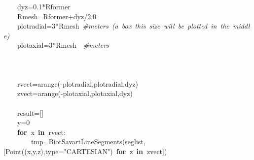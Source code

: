 \documentclass{article}
\newcommand{\hlstd}[1]{\textcolor[rgb]{0,0,0}{#1}}
\newcommand{\hlnum}[1]{\textcolor[rgb]{0.16,0.16,1}{#1}}
\newcommand{\hlstr}[1]{\textcolor[rgb]{1,0,0}{#1}}
\newcommand{\hlslc}[1]{\textcolor[rgb]{0.51,0.51,0.51}{\it{#1}}}
\newcommand{\hlsym}[1]{\textcolor[rgb]{0,0,0}{#1}}
\newcommand{\hlkwa}[1]{\textcolor[rgb]{0,0,0}{\bf{#1}}}
\newcommand{\hlkwb}[1]{\textcolor[rgb]{0.51,0,0}{#1}}
\newcommand{\hlkwd}[1]{\textcolor[rgb]{0,0,0.51}{#1}}
\begin{document}
\hlstd{}\hlstd{\ \ \ \ }\hlstd{dyz}\hlsym{=}\hlstd{}\hlnum{0.1}\hlstd{}\hlsym{{*}}\hlstd{Rformer\hspace*{\fill}\\
}\hlstd{\ \ \ \ }\hlstd{Rmesh}\hlsym{=}\hlstd{Rformer}\hlsym{+}\hlstd{dyz}\hlsym{/}\hlstd{}\hlnum{2.0}\hspace*{\fill}\\
\hlstd{}\hlstd{\ \ \ \ }\hlstd{plotradial}\hlsym{=}\hlstd{}\hlnum{3}\hlstd{}\hlsym{{*}}\hlstd{Rmesh\ }\hlslc{\#meters\ (a\ box\ this\ size\ will\ be\ plotted\ in\ the\ middle)}\hspace*{\fill}\\
\hlstd{}\hlstd{\ \ \ \ }\hlstd{plotaxial}\hlsym{=}\hlstd{}\hlnum{3}\hlstd{}\hlsym{{*}}\hlstd{Rmesh}\hlstd{\ \ }\hlstd{}\hlslc{\#meters}\hspace*{\fill}\\
\hlstd{}\hlstd{\ \ }\hlstd{\hspace*{\fill}\\
}\hlstd{\ \ \ \ }\hlstd{\hspace*{\fill}\\
\hspace*{\fill}\\
}\hlstd{\ \ \ \ }\hlstd{rvect}\hlsym{=}\hlstd{}\hlkwd{arange}\hlstd{}\hlsym{({-}}\hlstd{plotradial}\hlsym{,}\hlstd{plotradial}\hlsym{,}\hlstd{dyz}\hlsym{)}\hspace*{\fill}\\
\hlstd{}\hlstd{\ \ \ \ }\hlstd{zvect}\hlsym{=}\hlstd{}\hlkwd{arange}\hlstd{}\hlsym{({-}}\hlstd{plotaxial}\hlsym{,}\hlstd{plotaxial}\hlsym{,}\hlstd{dyz}\hlsym{)}\hspace*{\fill}\\
\hlstd{\hspace*{\fill}\\
}\hlstd{\ \ \ \ }\hlstd{result}\hlsym{={[}{]}}\hspace*{\fill}\\
\hlstd{}\hlstd{\ \ \ \ }\hlstd{y}\hlsym{=}\hlstd{}\hlnum{0}\hspace*{\fill}\\
\hlstd{}\hlstd{\ \ \ \ }\hlstd{}\hlkwa{for\ }\hlstd{x\ }\hlkwa{in\ }\hlstd{rvect}\hlsym{:}\hspace*{\fill}\\
\hlstd{}\hlstd{\ \ \ \ \ \ \ \ }\hlstd{tmp}\hlsym{=}\hlstd{}\hlkwd{Biot\textunderscore Savart\textunderscore LineSegments}\hlstd{}\hlsym{(}\hlstd{seglist}\hlsym{,{[}}\hlstd{}\hlkwd{Point}\hlstd{}\hlsym{((}\hlstd{x}\hlsym{,}\hlstd{y}\hlsym{,}\hlstd{z}\hlsym{),}\hlstd{}\hlkwb{type}\hlstd{}\hlsym{=}\hlstd{}\hlstr{"CARTESIAN"}\hlstd{}\hlsym{)\ }\hlstd{}\hlkwa{for\ }\hlstd{z\ }\hlkwa{in\ }\hlstd{zvect}\hlsym{{]})}\hspace*{\fill}\\
\end{document}
